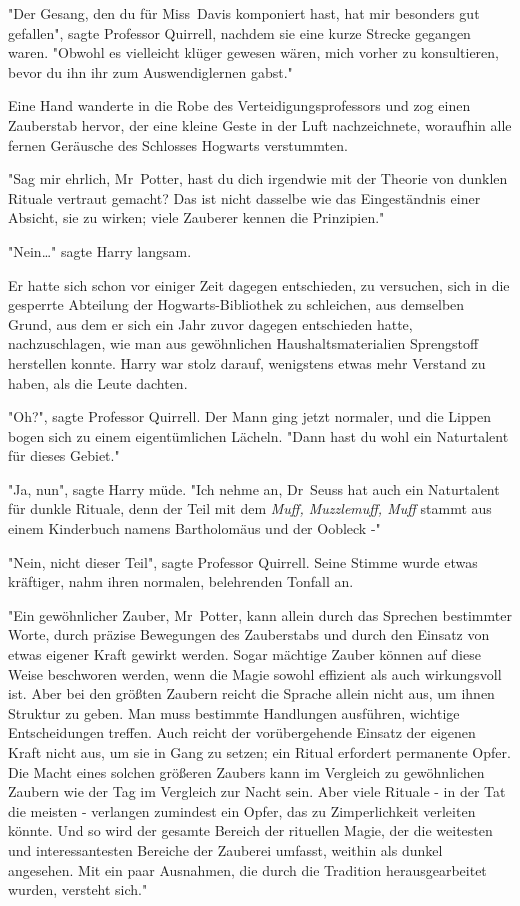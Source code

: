 {"Der Gesang, den du für Miss~Davis komponiert hast, hat mir besonders gut gefallen", sagte Professor Quirrell, nachdem sie eine kurze Strecke gegangen waren. "Obwohl es vielleicht klüger gewesen wären, mich vorher zu konsultieren, bevor du ihn ihr zum Auswendiglernen gabst."

Eine Hand wanderte in die Robe des Verteidigungsprofessors und zog einen Zauberstab hervor, der eine kleine Geste in der Luft nachzeichnete, woraufhin alle fernen Geräusche des Schlosses Hogwarts verstummten.

"Sag mir ehrlich, Mr~Potter, hast du dich irgendwie mit der Theorie von dunklen Rituale vertraut gemacht? Das ist nicht dasselbe wie das Eingeständnis einer Absicht, sie zu wirken; viele Zauberer kennen die Prinzipien."

"Nein…" sagte Harry langsam.

Er hatte sich schon vor einiger Zeit dagegen entschieden, zu versuchen, sich in die gesperrte Abteilung der Hogwarts-Bibliothek zu schleichen, aus demselben Grund, aus dem er sich ein Jahr zuvor dagegen entschieden hatte, nachzuschlagen, wie man aus gewöhnlichen Haushaltsmaterialien Sprengstoff herstellen konnte. Harry war stolz darauf, wenigstens etwas mehr Verstand zu haben, als die Leute dachten.

"Oh?", sagte Professor Quirrell. Der Mann ging jetzt normaler, und die Lippen bogen sich zu einem eigentümlichen Lächeln. "Dann hast du wohl ein Naturtalent für dieses Gebiet."

"Ja, nun", sagte Harry müde. "Ich nehme an, Dr~Seuss hat auch ein Naturtalent für dunkle Rituale, denn der Teil mit dem \emph{Muff, Muzzlemuff, Muff} stammt aus einem Kinderbuch namens Bartholomäus und der Oobleck -"

"Nein, nicht dieser Teil", sagte Professor Quirrell. Seine Stimme wurde etwas kräftiger, nahm ihren normalen, belehrenden Tonfall an.

"Ein gewöhnlicher Zauber, Mr~Potter, kann allein durch das Sprechen bestimmter Worte, durch präzise Bewegungen des Zauberstabs und durch den Einsatz von etwas eigener Kraft gewirkt werden. Sogar mächtige Zauber können auf diese Weise beschworen werden, wenn die Magie sowohl effizient als auch wirkungsvoll ist. Aber bei den größten Zaubern reicht die Sprache allein nicht aus, um ihnen Struktur zu geben. Man muss bestimmte Handlungen ausführen, wichtige Entscheidungen treffen. Auch reicht der vorübergehende Einsatz der eigenen Kraft nicht aus, um sie in Gang zu setzen; ein Ritual erfordert permanente Opfer. Die Macht eines solchen größeren Zaubers kann im Vergleich zu gewöhnlichen Zaubern wie der Tag im Vergleich zur Nacht sein. Aber viele Rituale - in der Tat die meisten - verlangen zumindest ein Opfer, das zu Zimperlichkeit verleiten könnte. Und so wird der gesamte Bereich der rituellen Magie, der die weitesten und interessantesten Bereiche der Zauberei umfasst, weithin als dunkel angesehen. Mit ein paar Ausnahmen, die durch die Tradition herausgearbeitet wurden, versteht sich."

}
